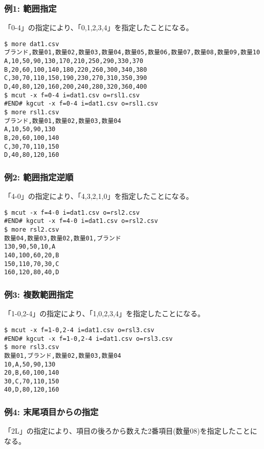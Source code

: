 \subsubsection*{例1: 範囲指定}

「0-4」の指定により、「0,1,2,3,4」を指定したことになる。


\begin{Verbatim}[baselinestretch=0.7,frame=single]
$ more dat1.csv
ブランド,数量01,数量02,数量03,数量04,数量05,数量06,数量07,数量08,数量09,数量10
A,10,50,90,130,170,210,250,290,330,370
B,20,60,100,140,180,220,260,300,340,380
C,30,70,110,150,190,230,270,310,350,390
D,40,80,120,160,200,240,280,320,360,400
$ mcut -x f=0-4 i=dat1.csv o=rsl1.csv
#END# kgcut -x f=0-4 i=dat1.csv o=rsl1.csv
$ more rsl1.csv
ブランド,数量01,数量02,数量03,数量04
A,10,50,90,130
B,20,60,100,140
C,30,70,110,150
D,40,80,120,160
\end{Verbatim}
\subsubsection*{例2: 範囲指定逆順}

「4-0」の指定により、「4,3,2,1,0」を指定したことになる。


\begin{Verbatim}[baselinestretch=0.7,frame=single]
$ mcut -x f=4-0 i=dat1.csv o=rsl2.csv
#END# kgcut -x f=4-0 i=dat1.csv o=rsl2.csv
$ more rsl2.csv
数量04,数量03,数量02,数量01,ブランド
130,90,50,10,A
140,100,60,20,B
150,110,70,30,C
160,120,80,40,D
\end{Verbatim}
\subsubsection*{例3: 複数範囲指定}

「1-0,2-4」の指定により、「1,0,2,3,4」を指定したことになる。


\begin{Verbatim}[baselinestretch=0.7,frame=single]
$ mcut -x f=1-0,2-4 i=dat1.csv o=rsl3.csv
#END# kgcut -x f=1-0,2-4 i=dat1.csv o=rsl3.csv
$ more rsl3.csv
数量01,ブランド,数量02,数量03,数量04
10,A,50,90,130
20,B,60,100,140
30,C,70,110,150
40,D,80,120,160
\end{Verbatim}
\subsubsection*{例4: 末尾項目からの指定}

「2L」の指定により、項目の後ろから数えた2番項目(数量08)を指定したことになる。


